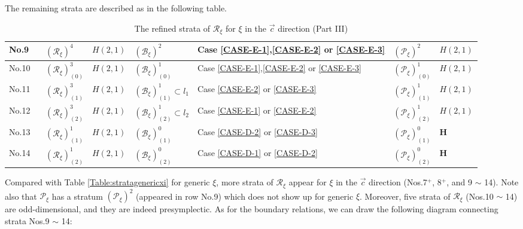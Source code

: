 \documentclass[12pt]{amsart}
\theoremstyle{definition}
\numberwithin{equation}{section}
\newcommand{\Reducedxi}{\mathcal{R}_\xi}
\newcommand{\Pxi}{\mathcal{P}_{\xi}}
\newcommand{\Bxi}{\mathcal{B}_{\xi}}
\newcommand{\Cartan}{\mathbf{H}}
\begin{document}
{   
   The remaining  strata are described as in the following table.
   \begin{table}[H]\centering
 \caption{The refined strata of  $\Reducedxi  $  for  $\xi$ in the $\vec{c}$ direction (Part III) } \label{Table:strataveccxi3} 
       \begin{supertabular}{|p{0.9cm}|p{2.2cm}| p{1.2cm}|p{2.3cm}|p{2.4cm}|  p{2.6cm} | p{1.5cm}      |  }\hline
   No.9 ~& $(\Reducedxi)^4 $
& $H(2,1)$ & $(\Bxi)^2   $ & Case  \eqref{CASE-E-1},\eqref{CASE-E-2} or \eqref{CASE-E-3} & $(\Pxi)^2 $ & $H(2,1)$\\
   \hline  No.10 ~& $(\Reducedxi)^3_{(0)}$
 &$H(2,1)$& $ (\Bxi)^1_{(0)}  $ & Case \eqref{CASE-E-1},\eqref{CASE-E-2} or \eqref{CASE-E-3} & $(\Pxi)^1_{(0)}$ & $H(2,1)$\\
   \hline  No.11 ~& $(\Reducedxi)^3_{(1)}$
 &$H(2,1)$&$ (\Bxi)^1_{(1)}  \subset l_1$& Case \eqref{CASE-E-2} or \eqref{CASE-E-3} & $(\Pxi)^1_{(1)}$ & $H(2,1)$\\
   \hline   
   No.12 ~& $(\Reducedxi)^3_{(2)}$
 &$H(2,1)$& $ (\Bxi)^1_{(2)}  \subset l_2$ & Case \eqref{CASE-E-1} or \eqref{CASE-E-2}& $(\Pxi)^1_{(2)}$ & $H(2,1)$ \\
   \hline  
   No.13 ~& $(\Reducedxi)^1_{(1)}$
 &$H(2,1)$&$(\Bxi)^0_{(1)}  $& Case \eqref{CASE-D-2} or \eqref{CASE-D-3} & $(\Pxi)^0_{(1)}$ & $\Cartan$ \\
   \hline  No.14 ~& $(\Reducedxi)^1_{(2)}$
 &$H(2,1)$& $(\Bxi)^0_{(2)}  $ & Case \eqref{CASE-D-1} or \eqref{CASE-D-2} & $(\Pxi)^0_{(2)}$ & $\Cartan$\\
   \hline   
    \end{supertabular}
   \end{table}  

 


 

Compared with Table \ref{Table:stratagenericxi} for generic $\xi$,  more strata of $\Reducedxi  $ appear for $\xi$ in the $\vec{c}$ direction (Nos.7$^+$, 8$^+$, and 9 $\sim$ 14). Note also that  $\Pxi $ has a stratum $(\Pxi)^2 $ (appeared in row No.9) which does not show up for generic $\xi$.    Moreover, five strata of $\Reducedxi  $ (Nos.10 $\sim$ 14) are   odd-dimensional, and they are  indeed presymplectic.
As for the boundary relations, we can draw the following diagram connecting  strata Nos.9 $\sim$ 14:


}
\end{document}

